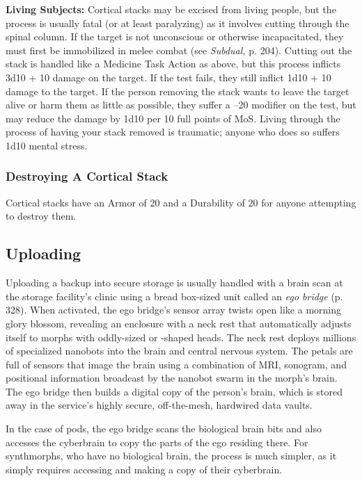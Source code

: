 \textbf{Living Subjects:} Cortical stacks may be excised 
from living people, but the process is usually fatal (or 
at least paralyzing) as it involves cutting through the 
spinal column. If the target is not unconscious or otherwise
incapacitated, they must first be immobilized
in melee combat (see \textit{Subdual,} p. 204). Cutting out 
the stack is handled like a Medicine Task Action as 
above, but this process inflicts 3d10 + 10 damage on 
the target. If the test fails, they still inflict 1d10 + 10 
damage to the target. If the person removing the stack 
wants to leave the target alive or harm them as little 
as possible, they suffer a –20 modifier on the test, but 
may reduce the damage by 1d10 per 10 full points of 
MoS. Living through the process of having your stack 
removed is traumatic; anyone who does so suffers 
1d10 mental stress.

\subsubsection{Destroying A Cortical Stack}

Cortical stacks have an Armor of 20 and a Durability 
of 20 for anyone attempting to destroy them.

\subsection{Uploading}

Uploading a backup into secure storage is usually 
handled with a brain scan at the storage facility's clinic 
using a bread box-sized unit called an \textit{ego bridge} (p. 
328). When activated, the ego bridge's sensor array 
twists open like a morning glory blossom, revealing an 
enclosure with a neck rest that automatically adjusts 
itself to morphs with oddly-sized or -shaped heads. 
The neck rest deploys millions of specialized nanobots 
into the brain and central nervous system. The petals 
are full of sensors that image the brain using a combination
of MRI, sonogram, and positional information
broadcast by the nanobot swarm in the morph's brain. 
The ego bridge then builds a digital copy of the person's
brain, which is stored away in the service's highly
secure, off-the-mesh, hardwired data vaults.

In the case of pods, the ego bridge scans the biological
brain bits and also accesses the cyberbrain to copy
the parts of the ego residing there. For synthmorphs, 
who have no biological brain, the process is much 
simpler, as it simply requires accessing and making a 
copy of their cyberbrain.


